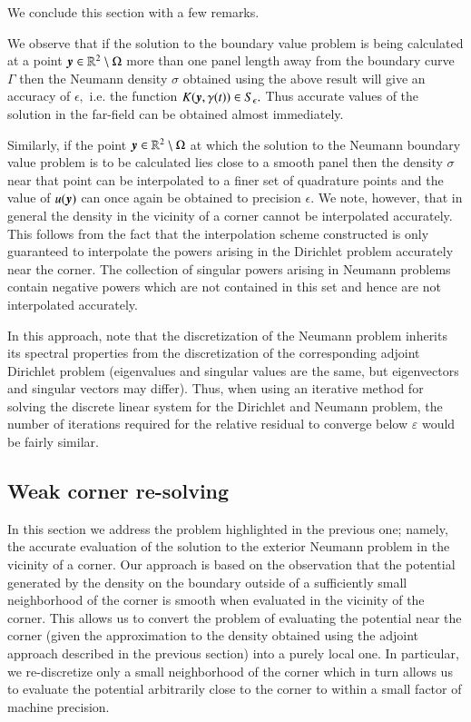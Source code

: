We conclude this section with a few remarks. 

\begin{remark}
\label{rem:far-field-accuracy}
We observe that if the solution to the boundary value problem is being calculated at a point $\boldsymbol{y} \in \mathbb{R}^2\setminus \Omega$ more than one panel length away from the boundary curve $\Gamma$ then the Neumann density $\sigma$ obtained using the above result will give an accuracy of $\epsilon,$ i.e. the function $K(\boldsymbol{y},\gamma(t)) \in S_\epsilon.$ Thus accurate values of the solution in the far-field can be obtained almost immediately.
\end{remark}
\begin{remark}
\label{rem:strong-sol-smooth}
Similarly, if the point $\boldsymbol{y} \in \mathbb{R}^2 \setminus \Omega$ at which the solution to the Neumann boundary value problem is to be calculated lies close to a smooth panel then the density $\sigma$ near that point can be interpolated to a finer set of quadrature points and the value of $u(\boldsymbol{y})$ can once again be obtained to precision $\epsilon.$ We note, however, that in general the density in the vicinity of a corner cannot be interpolated accurately. This follows from the fact that the interpolation scheme constructed is only guaranteed to interpolate the powers arising in the Dirichlet problem accurately near the corner. The collection of singular powers arising in Neumann problems contain negative powers which are not contained in this set and hence are not interpolated accurately.
\end{remark}
{\color{blue}
\begin{remark}
In this approach, note that the discretization of the Neumann problem inherits its spectral properties from the discretization of the corresponding adjoint Dirichlet problem (eigenvalues and singular values are the same, but eigenvectors and singular vectors may differ). Thus, when using an iterative method for solving the discrete linear system for the Dirichlet and Neumann problem, the number of iterations required for the relative residual to converge below $\varepsilon$ would be fairly similar. 
\end{remark}
}

\subsection{Weak corner re-solving \label{sec:resolve}}
In this section we address the problem highlighted in the previous one; namely, the accurate evaluation of the solution to the exterior Neumann problem in the vicinity of a corner. Our approach is based on the observation that the potential generated by the density on the boundary outside of a sufficiently small neighborhood of the corner is smooth when evaluated in the vicinity of the corner. This allows us to convert the problem of evaluating the potential near the corner (given the approximation to the density obtained using the adjoint approach described in the previous section) into a purely local one. In particular, we re-discretize only a small neighborhood of the corner which in turn allows us to evaluate the potential arbitrarily close to the corner to within a small factor of machine precision. 

